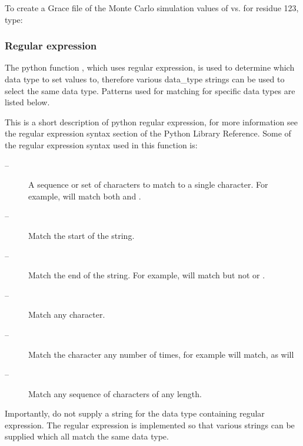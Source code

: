 


To create a Grace  file of the Monte Carlo simulation values of 
 vs. 
 for residue
123, type:







\subsubsection{Regular expression}

The python  function 
, which uses regular expression,  is used to determine which data
type to set values to, therefore various data\_type strings can be used to select the same
data type.  Patterns used for matching for specific data types are listed below.

This is a short description of python  regular expression,  for more information see the
regular expression  syntax section of the Python  Library Reference.  Some of the regular
expression syntax used in this function is:

\begin{description}
\item[    
 --]   A sequence  or set of characters to match to a single character.  For example, 
 will match both 
 and 
. 
\item[    
 --]   Match the start of the string. 
\item[    
 --]   Match the end of the string.  For example, 
 will match 
 but not 
 or 
. 
\item[    
 --]   Match any character. 
\item[    
 --]   Match the character 
 any number of times, for example 
 will match, as will 
 
\item[    
 --]   Match any sequence  of characters of any length. 
\end{description}
Importantly, do not supply a string for the data type containing regular expression.   The
regular expression  is implemented so that various strings can be supplied which all match
the same data type.


